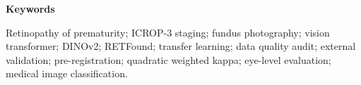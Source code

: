 \noindent\textbf{Keywords}\par
\noindent Retinopathy of prematurity; ICROP-3 staging; fundus photography; vision transformer; DINOv2; RETFound; transfer learning; data quality audit; external validation; pre-registration; quadratic weighted kappa; eye-level evaluation; medical image classification.
\clearpage
